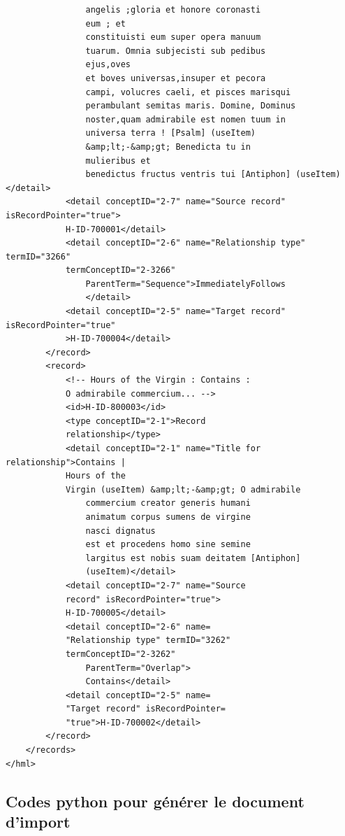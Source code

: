 \documentclass[a4paper,12pt,twoside]{book}
\begin{document}
\begin{verbatim}
                angelis ;gloria et honore coronasti 
                eum ; et
                constituisti eum super opera manuum
                tuarum. Omnia subjecisti sub pedibus 
                ejus,oves
                et boves universas,insuper et pecora 
                campi, volucres caeli, et pisces marisqui
                perambulant semitas maris. Domine, Dominus
                noster,quam admirabile est nomen tuum in
                universa terra ! [Psalm] (useItem) 
                &amp;lt;-&amp;gt; Benedicta tu in 
                mulieribus et
                benedictus fructus ventris tui [Antiphon] (useItem)</detail>
            <detail conceptID="2-7" name="Source record" isRecordPointer="true">
            H-ID-700001</detail>
            <detail conceptID="2-6" name="Relationship type" termID="3266" 
            termConceptID="2-3266"
                ParentTerm="Sequence">ImmediatelyFollows
                </detail>
            <detail conceptID="2-5" name="Target record" isRecordPointer="true"
            >H-ID-700004</detail>
        </record>
        <record>
            <!-- Hours of the Virgin : Contains :
            O admirabile commercium... -->
            <id>H-ID-800003</id>
            <type conceptID="2-1">Record 
            relationship</type>
            <detail conceptID="2-1" name="Title for relationship">Contains | 
            Hours of the
            Virgin (useItem) &amp;lt;-&amp;gt; O admirabile
                commercium creator generis humani 
                animatum corpus sumens de virgine 
                nasci dignatus
                est et procedens homo sine semine 
                largitus est nobis suam deitatem [Antiphon]
                (useItem)</detail>
            <detail conceptID="2-7" name="Source 
            record" isRecordPointer="true">
            H-ID-700005</detail>
            <detail conceptID="2-6" name=
            "Relationship type" termID="3262" 
            termConceptID="2-3262"
                ParentTerm="Overlap">
                Contains</detail>
            <detail conceptID="2-5" name=
            "Target record" isRecordPointer=
            "true">H-ID-700002</detail>
        </record>
    </records>
</hml>
	\end{verbatim}
	
	\subsection{Codes python pour générer le document d'import}
	
\end{document}
